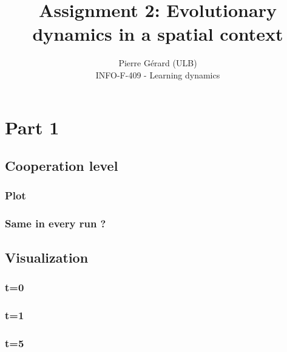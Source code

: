\documentclass[11pt]{article}
\begin{document}
 
 
\setlength\parindent{0pt}
 
\title{Assignment 2: Evolutionary dynamics in a spatial context}%
\author{Pierre Gérard (ULB)\\ %
INFO-F-409 - Learning dynamics} %
 
\maketitle

\section{Part 1}

\subsection{Cooperation level}

\subsubsection{Plot}

\subsubsection{Same in every run ?}

\subsection{Visualization}

\subsubsection{t=0}

\subsubsection{t=1}

\subsubsection{t=5}
\end{document}
